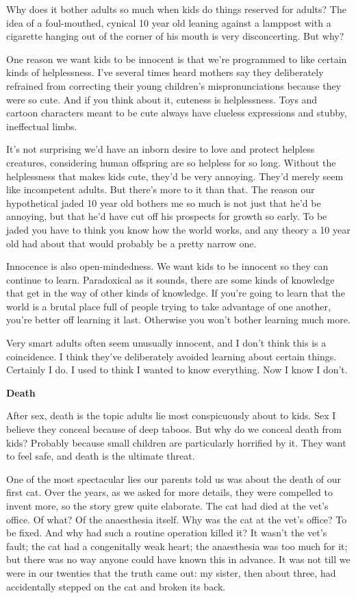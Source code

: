 Why does it bother adults so much when kids do things reserved for
adults? The idea of a foul-mouthed, cynical 10 year old leaning against
a lamppost with a cigarette hanging out of the corner of his mouth is
very disconcerting. But why?

One reason we want kids to be innocent is that we're programmed to like
certain kinds of helplessness. I've several times heard mothers say they
deliberately refrained from correcting their young children's
mispronunciations because they were so cute. And if you think about it,
cuteness is helplessness. Toys and cartoon characters meant to be cute
always have clueless expressions and stubby, ineffectual limbs.

It's not surprising we'd have an inborn desire to love and protect
helpless creatures, considering human offspring are so helpless for so
long. Without the helplessness that makes kids cute, they'd be very
annoying. They'd merely seem like incompetent adults. But there's more
to it than that. The reason our hypothetical jaded 10 year old bothers
me so much is not just that he'd be annoying, but that he'd have cut off
his prospects for growth so early. To be jaded you have to think you
know how the world works, and any theory a 10 year old had about that
would probably be a pretty narrow one.

Innocence is also open-mindedness. We want kids to be innocent so they
can continue to learn. Paradoxical as it sounds, there are some kinds of
knowledge that get in the way of other kinds of knowledge. If you're
going to learn that the world is a brutal place full of people trying to
take advantage of one another, you're better off learning it last.
Otherwise you won't bother learning much more.

Very smart adults often seem unusually innocent, and I don't think this
is a coincidence. I think they've deliberately avoided learning about
certain things. Certainly I do. I used to think I wanted to know
everything. Now I know I don't.

\textbf{Death}

After sex, death is the topic adults lie most conspicuously about to
kids. Sex I believe they conceal because of deep taboos. But why do we
conceal death from kids? Probably because small children are
particularly horrified by it. They want to feel safe, and death is the
ultimate threat.

One of the most spectacular lies our parents told us was about the death
of our first cat. Over the years, as we asked for more details, they
were compelled to invent more, so the story grew quite elaborate. The
cat had died at the vet's office. Of what? Of the anaesthesia itself.
Why was the cat at the vet's office? To be fixed. And why had such a
routine operation killed it? It wasn't the vet's fault; the cat had a
congenitally weak heart; the anaesthesia was too much for it; but there
was no way anyone could have known this in advance. It was not till we
were in our twenties that the truth came out: my sister, then about
three, had accidentally stepped on the cat and broken its back.

